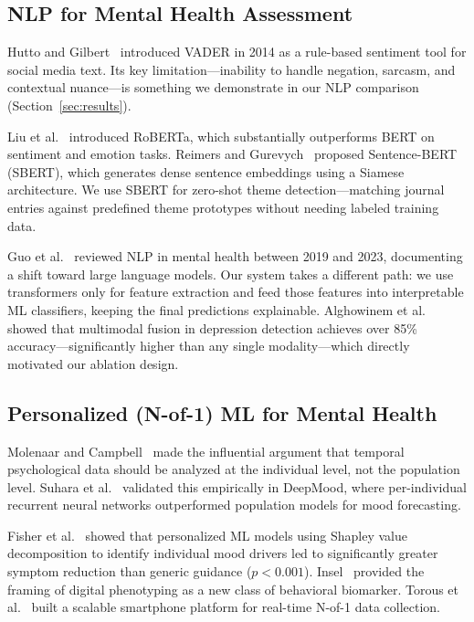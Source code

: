 \documentclass[conference]{IEEEtran}
\begin{document}
\subsection{NLP for Mental Health Assessment}

Hutto and Gilbert~\cite{hutto2014vader} introduced VADER in 2014 as a rule-based sentiment tool for social media text. Its key limitation---inability to handle negation, sarcasm, and contextual nuance---is something we demonstrate in our NLP comparison (Section~\ref{sec:results}).

Liu et al.~\cite{liu2019roberta} introduced RoBERTa, which substantially outperforms BERT on sentiment and emotion tasks. Reimers and Gurevych~\cite{reimers2019sbert} proposed Sentence-BERT (SBERT), which generates dense sentence embeddings using a Siamese architecture. We use SBERT for zero-shot theme detection---matching journal entries against predefined theme prototypes without needing labeled training data.

Guo et al.~\cite{guo2024} reviewed NLP in mental health between 2019 and 2023, documenting a shift toward large language models. Our system takes a different path: we use transformers only for feature extraction and feed those features into interpretable ML classifiers, keeping the final predictions explainable. Alghowinem et al.~\cite{alghowinem2018} showed that multimodal fusion in depression detection achieves over 85\% accuracy---significantly higher than any single modality---which directly motivated our ablation design.

\subsection{Personalized (N-of-1) ML for Mental Health}

Molenaar and Campbell~\cite{molenaar2009} made the influential argument that temporal psychological data should be analyzed at the individual level, not the population level. Suhara et al.~\cite{suhara2017deepmood} validated this empirically in DeepMood, where per-individual recurrent neural networks outperformed population models for mood forecasting.

Fisher et al.~\cite{fisher2018} showed that personalized ML models using Shapley value decomposition to identify individual mood drivers led to significantly greater symptom reduction than generic guidance ($p < 0.001$). Insel~\cite{insel2017} provided the framing of digital phenotyping as a new class of behavioral biomarker. Torous et al.~\cite{torous2016} built a scalable smartphone platform for real-time N-of-1 data collection.
\end{document}
